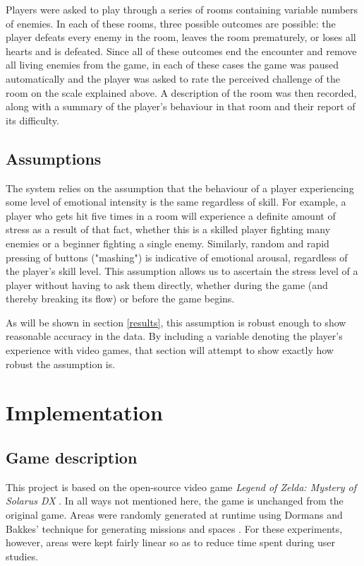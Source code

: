 \documentclass[a4paper]{article}
\begin{document}
\begin{multicols*}{2}
Players were asked to play through a series of rooms containing variable numbers of enemies. In each of these rooms, three possible outcomes are possible: the player  defeats every enemy in the room, leaves the room prematurely, or loses all hearts and is defeated. 
Since all of these outcomes end the encounter and remove all living enemies from the game, in each of these cases the game was paused automatically and the player was asked to rate the perceived challenge of the room on the scale explained above. A description of the room was then recorded, along with a summary of the player's behaviour in that room and their report of its difficulty.

\subsection{Assumptions}
The system relies on the assumption that the behaviour of a player experiencing some level of emotional intensity is the same regardless of skill. For example, a player who gets hit five times in a room will experience a definite amount of stress as a result of that fact, whether this is a skilled player fighting many enemies or a beginner fighting a single enemy. Similarly, random and rapid pressing of buttons ("mashing") is indicative of emotional arousal, regardless of the player's skill level. This assumption allows us to ascertain the stress level of a player without having to ask them directly, whether during the game (and thereby breaking its flow) or before the game begins.

As will be shown in section \ref{results}, this assumption is robust enough to show reasonable accuracy in the data. By including a variable denoting the player's experience with video games, that section will attempt to show exactly how robust the assumption is.

\section{Implementation}

\subsection{Game description}
This project is based on the open-source video game \emph{Legend of Zelda: Mystery of Solarus DX} \cite{zeldasolarus}. In all ways not mentioned here, the game is unchanged from the original game. Areas were randomly generated at runtime using Dormans and Bakkes' technique for generating missions and spaces \cite{missiongrammar}. For these experiments, however, areas were kept fairly linear so as to reduce time spent during user studies.


\end{multicols*}
\end{document}
